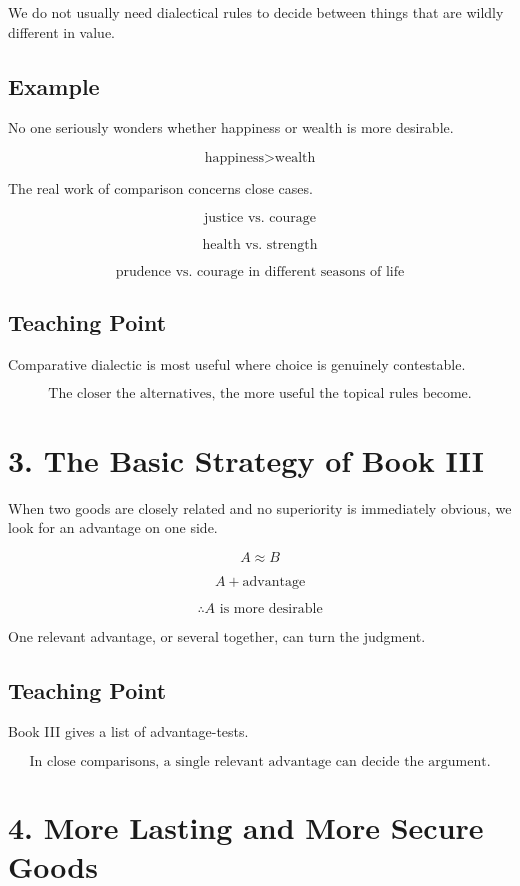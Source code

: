 \documentclass[12pt]{article}
\begin{document}
We do not usually need dialectical rules to decide between things that are
wildly different in value.

\subsection*{Example}

No one seriously wonders whether happiness or wealth is more desirable.

\[
\text{happiness} > \text{wealth}
\]

The real work of comparison concerns close cases.

\[
\text{justice vs. courage}
\]

\[
\text{health vs. strength}
\]

\[
\text{prudence vs. courage in different seasons of life}
\]

\subsection*{Teaching Point}

Comparative dialectic is most useful where choice is genuinely contestable.

\[
\boxed{
\text{The closer the alternatives, the more useful the topical rules become.}
}
\]

\section*{3. The Basic Strategy of Book III}

When two goods are closely related and no superiority is immediately obvious,
we look for an advantage on one side.

\[
A \approx B
\]

\[
A + \text{advantage}
\]

\[
\therefore A \text{ is more desirable}
\]

One relevant advantage, or several together, can turn the judgment.

\subsection*{Teaching Point}

Book III gives a list of advantage-tests.

\[
\boxed{
\text{In close comparisons, a single relevant advantage can decide the argument.}
}
\]

\section*{4. More Lasting and More Secure Goods}
\end{document}
